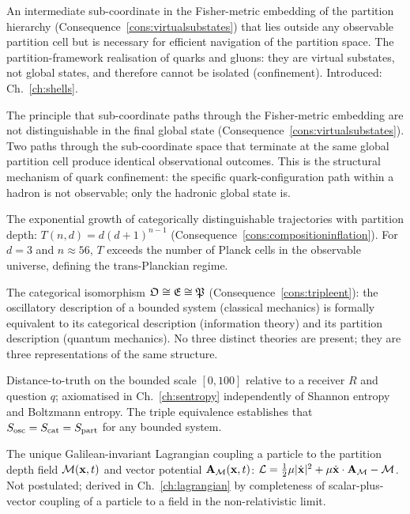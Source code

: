 \begin{description}[leftmargin=0pt, itemsep=6pt]
  \item[Virtual substate.]
    An intermediate sub-coordinate in the Fisher-metric embedding of the
    partition hierarchy (Consequence~\ref{cons:virtualsubstates}) that lies
    outside any observable partition cell but is necessary for efficient
    navigation of the partition space.  The partition-framework realisation
    of quarks and gluons: they are virtual substates, not global states,
    and therefore cannot be isolated (confinement).
    Introduced: Ch.~\ref{ch:shells}.

  \item[Path opacity.]
    The principle that sub-coordinate paths through the Fisher-metric
    embedding are not distinguishable in the final global state
    (Consequence~\ref{cons:virtualsubstates}).  Two paths through the
    sub-coordinate space that terminate at the same global partition cell
    produce identical observational outcomes.  This is the structural
    mechanism of quark confinement: the specific quark-configuration path
    within a hadron is not observable; only the hadronic global state is.

  \item[Composition inflation.]
    The exponential growth of categorically distinguishable trajectories
    with partition depth: $T(n,d)=d(d+1)^{n-1}$
    (Consequence~\ref{cons:compositioninflation}).  For $d=3$ and
    $n\approx 56$, $T$ exceeds the number of Planck cells in the observable
    universe, defining the trans-Planckian regime.

  \item[Triple Equivalence.]
    The categorical isomorphism $\mathfrak{O}\cong\mathfrak{E}\cong\mathfrak{P}$
    (Consequence~\ref{cons:tripleent}): the oscillatory description of a
    bounded system (classical mechanics) is formally equivalent to its
    categorical description (information theory) and its partition
    description (quantum mechanics).  No three distinct theories are
    present; they are three representations of the same structure.

  \item[S-entropy.]
    Distance-to-truth on the bounded scale $[0,100]$ relative to a receiver
    $R$ and question $q$; axiomatised in Ch.~\ref{ch:sentropy} independently
    of Shannon entropy and Boltzmann entropy.  The triple equivalence
    establishes that $S_{\mathrm{osc}}=S_{\mathrm{cat}}=S_{\mathrm{part}}$ for any bounded system.

  \item[Partition Lagrangian.]
    The unique Galilean-invariant Lagrangian coupling a particle to the
    partition depth field $\mathcal{M}(\mathbf{x},t)$ and vector potential
    $\mathbf{A}_{\mathcal{M}}(\mathbf{x},t)$:
    $\mathcal{L}=\tfrac{1}{2}\mu|\dot{\mathbf{x}}|^{2}+\mu\dot{\mathbf{x}}\cdot\mathbf{A}_{\mathcal{M}}-\mathcal{M}$.
    Not postulated; derived in Ch.~\ref{ch:lagrangian} by completeness of
    scalar-plus-vector coupling of a particle to a field in the
    non-relativistic limit.


\end{description}
